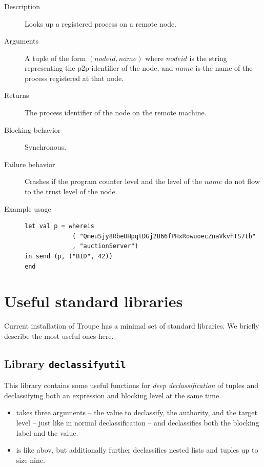 \subsubsection{}
\begin{description}
    \item [Description] Looks up a registered process on a remote node.
    \item [Arguments] A tuple of the form $(\mathit{nodeid}, \mathit{name})$ where $\mathit{nodeid}$ is the string representing the p2p-identifier of the node, and $\mathit{name}$ is the name of the process registered at that node.
    \item [Returns] The process identifier of the node on the remote machine.
    \item [Blocking behavior] Synchronous.
    \item [Failure behavior] Crashes if the program counter level and the level of the $\mathit{name}$ do not flow to the trust level of the node.
    \item [Example usage]
\begin{minipage}[t]{30em}
\begin{verbatim}
let val p = whereis
             ( "QmeuSjy8RbeUHpqtDGj2B66fPHxRowuoecZnaVkvhTS7tb"
             , "auctionServer")
in send (p, ("BID", 42))
end
\end{verbatim}
\end{minipage}
\end{description}


\section{Useful standard libraries}
Current installation of Troupe has a minimal set of standard libraries. We briefly describe the
most useful ones here.


\subsection{Library {\tt declassifyutil}}
This library contains some useful functions for \emph{deep declassification} of tuples and
declassifying both an expression and blocking level at the same time.

\begin{itemize}
\item {} takes three arguments -- the value to declassify,
the authority, and the target level -- just like in normal declassification -- and declassifies
both the blocking label and the value.

\item {} is like abov, but additionally
further declassifies nested lists and tuples up to size nine.
\end{itemize}


